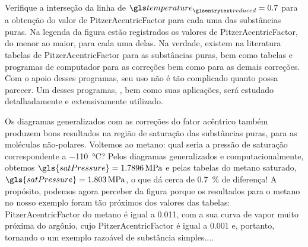     Verifique a interseção da linha de $\gsub{temperature}{reduced} =
    \num{0.7}$ para a obtenção do valor de \gls{PitzerAcentricFactor} para cada
    uma das substâncias puras. Na legenda da figura estão registrados os
    valores de \gls{PitzerAcentricFactor}, do menor ao maior, para cada uma
    delas. Na verdade, existem na literatura tabelas de
    \gls{PitzerAcentricFactor} para as substâncias puras, bem como tabelas e
    programas de computador para as correções 
    bem como para as demais correções. Com o apoio desses programas, seu uso
    não é tão complicado quanto possa parecer. Um desses programas,
    , bem como suas aplicações, será estudado detalhadamente e
    extensivamente utilizado.

    Os diagramas generalizados com as correções do fator acêntrico também
    produzem bons resultados na região de saturação das substâncias puras, para
    as moléculas não-polares. Voltemos ao metano: qual seria a pressão de
    saturação correspondente a \SI{-110}{\celsius}? Pelos diagramas
    generalizados e computacionalmente, obtemos $\gls{satPressure} =
    \SI{1.7896}{\mega\pascal}$ e pelas tabelas do metano saturado,
    $\gls{satPressure} = \SI{1.803}{\mega\pascal}$, o que dá cerca de
    \SI{0.7}{\percent} de diferença! A propósito, podemos agora perceber da
    figura porque os resultados para o metano no nosso exemplo foram tão
    próximos dos valores das tabelas: \gls{PitzerAcentricFactor} do metano é
    igual a \num{0.011}, com a sua curva de vapor muito próxima do argônio,
    cujo \gls{PitzerAcentricFactor} é igual a \num{0.001} e, portanto, tornando
    o um exemplo razoável de substância simples....

